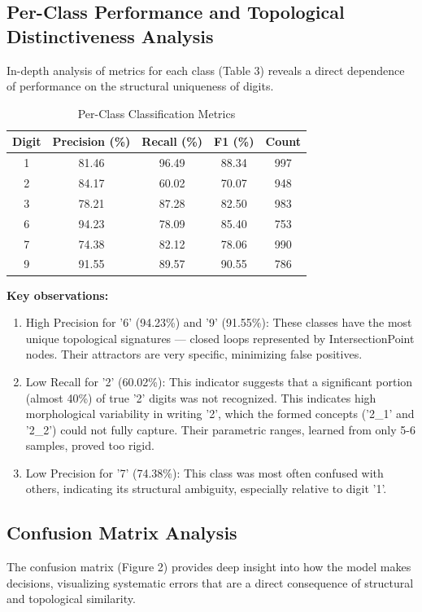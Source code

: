 \documentclass[conference]{IEEEtran}
\begin{document}
\subsection{Per-Class Performance and Topological Distinctiveness Analysis}
In-depth analysis of metrics for each class (Table 3) reveals a direct dependence of performance on the structural uniqueness of digits.

\begin{table}[h]
\centering
\caption{Per-Class Classification Metrics}
\begin{tabular}{ccccc}
\toprule
\textbf{Digit} & \textbf{Precision (\%)} & \textbf{Recall (\%)} & \textbf{F1 (\%)} & \textbf{Count} \\
\midrule
1 & 81.46 & 96.49 & 88.34 & 997 \\
2 & 84.17 & 60.02 & 70.07 & 948 \\
3 & 78.21 & 87.28 & 82.50 & 983 \\
6 & 94.23 & 78.09 & 85.40 & 753 \\
7 & 74.38 & 82.12 & 78.06 & 990 \\
9 & 91.55 & 89.57 & 90.55 & 786 \\
\bottomrule
\end{tabular}
\end{table}

\textbf{Key observations:}
\begin{enumerate}
    \item High Precision for '6' (94.23\%) and '9' (91.55\%): These classes have the most unique topological signatures — closed loops represented by IntersectionPoint nodes. Their attractors are very specific, minimizing false positives.
    \item Low Recall for '2' (60.02\%): This indicator suggests that a significant portion (almost 40\%) of true '2' digits was not recognized. This indicates high morphological variability in writing '2', which the formed concepts ('2\_1' and '2\_2') could not fully capture. Their parametric ranges, learned from only 5-6 samples, proved too rigid.
    \item Low Precision for '7' (74.38\%): This class was most often confused with others, indicating its structural ambiguity, especially relative to digit '1'.
\end{enumerate}

\subsection{Confusion Matrix Analysis}
The confusion matrix (Figure 2) provides deep insight into how the model makes decisions, visualizing systematic errors that are a direct consequence of structural and topological similarity.
\end{document}
